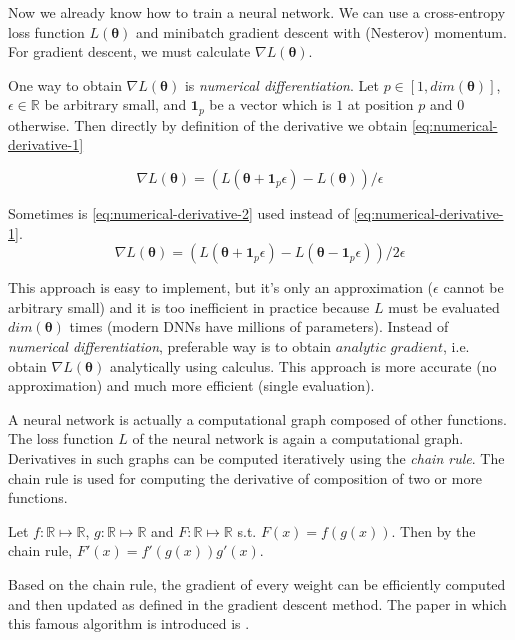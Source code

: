 Now we already know how to train a neural network. We can use a cross-entropy loss function $L (\pmb \theta)$ and minibatch gradient descent with (Nesterov) momentum. For gradient descent, we must calculate $\nabla L (\pmb \theta)$.

One way to obtain $\nabla L (\pmb \theta)$ is \textit{numerical differentiation}. 
Let $p \in [1, dim(\pmb \theta)]$, $\epsilon \in \mathbb{R}$ be arbitrary small, and $\pmb 1_p$ be a vector which is $1$ at position $p$ and $0$ otherwise. Then directly by definition of the derivative we obtain \ref{eq:numerical-derivative-1}

\begin{equation}\label{eq:numerical-derivative-1}
\nabla L (\pmb \theta) = (L(\pmb \theta + \pmb 1_p \epsilon) - L (\pmb \theta)) / \epsilon
\end{equation}

Sometimes is \ref{eq:numerical-derivative-2} used instead of \ref{eq:numerical-derivative-1}.
\begin{equation}\label{eq:numerical-derivative-2}
\nabla L (\pmb \theta) = (L(\pmb \theta + \pmb 1_p \epsilon) - L (\pmb \theta - \pmb 1_p \epsilon)) / 2 \epsilon
\end{equation}

This approach is easy to implement, but it's only an approximation ($\epsilon$ cannot be arbitrary small) and it is too inefficient in practice because $L$ must be evaluated $dim(\pmb\theta)$ times (modern DNNs have millions of parameters). Instead of \textit{numerical differentiation}, preferable way is to obtain $\textit{analytic gradient}$, i.e. obtain $\nabla L (\pmb \theta)$ analytically using calculus. This approach is more accurate (no approximation) and much more efficient (single evaluation).


A neural network is actually a computational graph composed of other functions. The loss function $L$ of the neural network is again a computational graph. Derivatives in such graphs can be computed iteratively using the \textit{chain rule}. The chain rule is used for computing the derivative of composition of two or more functions. 

Let $f: \mathbb{R} \mapsto \mathbb{R}$, $g: \mathbb{R} \mapsto \mathbb{R}$ and $F: \mathbb{R} \mapsto \mathbb{R}$ s.t. $F(x) = f(g(x))$. Then by the chain rule, $F'(x) = f'(g(x))g'(x)$.

Based on the chain rule, the gradient of every weight can be efficiently computed and then updated as defined in the gradient descent method. The paper in which this famous algorithm is introduced is \cite{Rumelhart:1986:LIR:104279.104293}.
